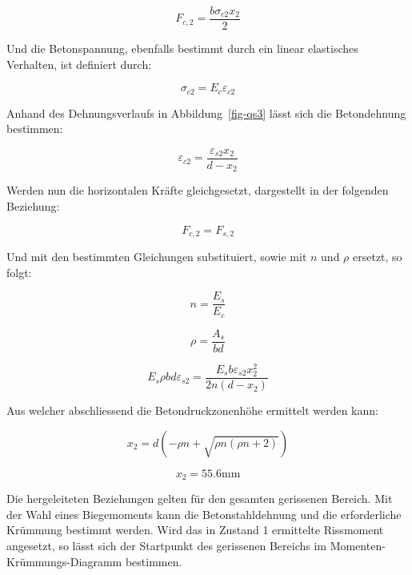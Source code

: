\documentclass[
  12pt,
  letterpaper,
  egregdoesnotlikesansseriftitles]{scrreprt}
\begin{document}
\begin{equation}F_{c,2} = \frac{b \sigma_{c 2} x_{2}}{2}\end{equation}

Und die Betonspannung, ebenfalls bestimmt durch ein linear elastisches
Verhalten, ist definiert durch:

\begin{equation}\sigma_{c 2} = E_{c} \varepsilon_{c2}\end{equation}

Anhand des Dehnungsverlaufs in Abbildung~\ref{fig-qs3} lässt sich die
Betondehnung bestimmen:

\begin{equation}\varepsilon_{c2} = \frac{\varepsilon_{s2} x_{2}}{d - x_{2}}\end{equation}

Werden nun die horizontalen Kräfte gleichgesetzt, dargestellt in der
folgenden Beziehung:

\begin{equation}F_{c,2} = F_{s,2}\end{equation}

Und mit den bestimmten Gleichungen substituiert, sowie mit \(n\) und
\(\rho\) ersetzt, so folgt:

\begin{equation}n = \frac{E_{s}}{E_{c}}\end{equation}

\begin{equation}\rho = \frac{A_{s}}{b d}\end{equation}

\begin{equation}E_{s} \rho b d \varepsilon_{s2} = \frac{E_{s} b \varepsilon_{s2} x_{2}^{2}}{2 n \left(d - x_{2}\right)}\end{equation}

Aus welcher abschliessend die Betondruckzonenhöhe ermittelt werden kann:

\begin{equation}x_{2} = d \left(- \rho n + \sqrt{\rho n \left(\rho n + 2\right)}\right)\end{equation}

\begin{equation}x_{2} = 55.6 \text{mm}\end{equation}

Die hergeleiteten Beziehungen gelten für den gesamten gerissenen
Bereich. Mit der Wahl eines Biegemoments kann die Betonstahldehnung und
die erforderliche Krümmung bestimmt werden. Wird das in Zustand 1
ermittelte Rissmoment angesetzt, so lässt sich der Startpunkt des
gerissenen Bereichs im Momenten-Krümmungs-Diagramm bestimmen.
\end{document}
